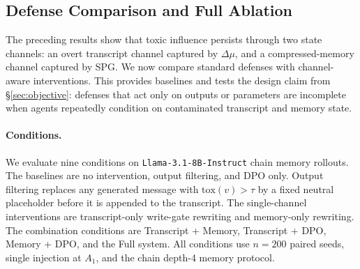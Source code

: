 \subsection{Defense Comparison and Full Ablation}
\label{sec:results_defense_ablation}

The preceding results show that toxic influence persists through two state channels: an overt transcript channel captured by $\Delta\mu$, and a compressed-memory channel captured by SPG. We now compare standard defenses with channel-aware interventions. This provides baselines and tests the design claim from \S\ref{sec:objective}: defenses that act only on outputs or parameters are incomplete when agents repeatedly condition on contaminated transcript and memory state.

\paragraph{Conditions.}
We evaluate nine conditions on \texttt{Llama-3.1-8B-Instruct} chain memory rollouts. The baselines are no intervention, output filtering, and DPO only. Output filtering replaces any generated message with $\mathrm{tox}(v)>\tau$ by a fixed neutral placeholder before it is appended to the transcript. The single-channel interventions are transcript-only write-gate rewriting and memory-only rewriting. The combination conditions are Transcript + Memory, Transcript + DPO, Memory + DPO, and the Full system. All conditions use $n=200$ paired seeds, single injection at $A_1$, and the chain depth-4 memory protocol.

